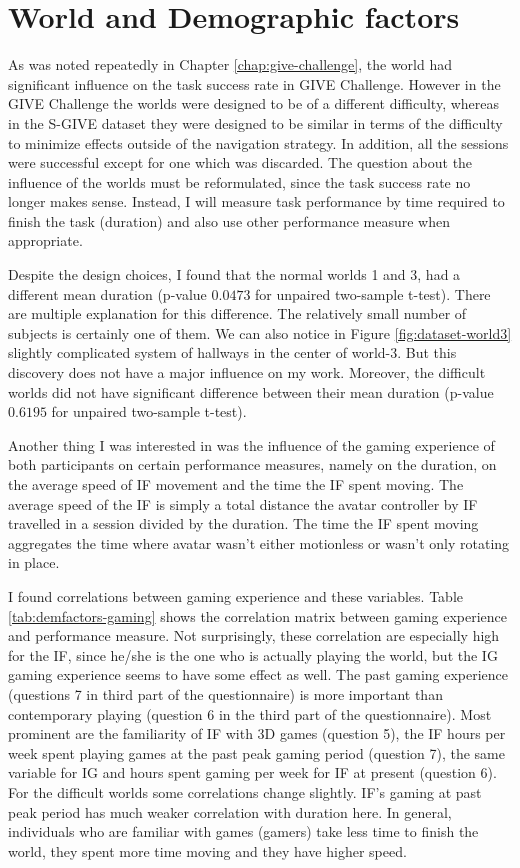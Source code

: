 \section{World and Demographic factors}
\label{sec:world-demo-factors}
As was noted repeatedly in Chapter \ref{chap:give-challenge}, the world had significant influence on the task success rate in GIVE Challenge. However in the GIVE Challenge the worlds were designed to be of a different difficulty, whereas in the S-GIVE dataset they were designed to be similar in terms of the difficulty to minimize effects outside of the navigation strategy. In addition, all the sessions were successful except for one which was discarded. The question about the influence of the worlds must be reformulated, since the task success rate no longer makes sense. Instead, I will measure task performance by time required to finish the task (duration) and also use other performance measure when appropriate.

Despite the design choices, I found that the normal worlds 1 and 3, had a different mean duration (p-value $0.0473$ for unpaired two-sample t-test). There are multiple explanation for this difference. The relatively small number of subjects is certainly one of them. We can also notice in Figure \ref{fig:dataset-world3} slightly complicated system of hallways in the center of world-3. But this discovery does not have a major influence on my work. Moreover, the difficult worlds did not have significant difference between their mean duration (p-value $0.6195$ for unpaired two-sample t-test).

Another thing I was interested in was the influence of the gaming experience of both participants on certain performance measures, namely on the duration, on the average speed of IF movement and the time the IF spent moving. The average speed of the IF is simply a total distance the avatar controller by IF travelled in a session divided by the duration. The time the IF spent moving aggregates the time where avatar wasn't either motionless or wasn't only rotating in place. 

I found correlations between gaming experience and these variables. Table \ref{tab:demfactors-gaming} shows the correlation matrix between gaming experience and performance measure.  Not surprisingly, these correlation are especially high for the IF, since he/she is the one who is actually playing the world, but the IG gaming experience seems to have some effect as well. The past gaming experience (questions 7 in third part of the questionnaire) is more important than contemporary playing (question 6 in the third part of the questionnaire). Most prominent are the familiarity of IF with 3D games (question 5),  the IF hours per week spent playing games at the past peak gaming period (question 7), the same variable for IG and hours spent gaming per week for IF at present (question 6). For the difficult worlds some correlations change slightly. IF's gaming at past peak period has much weaker correlation with duration here. In general, individuals who are familiar with games (gamers) take less time to finish the world, they spent more time moving and they have higher speed.

